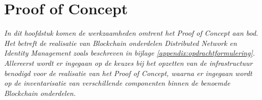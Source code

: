 \chapter{Proof of Concept}

\textit{In dit hoofdstuk komen de werkzaamheden omtrent het Proof of Concept aan bod. Het betreft de realisatie van Blockchain onderdelen Distributed Network en Identity Management zoals beschreven in bijlage \ref{appendix:opdrachtformulering}. Allereerst wordt er ingegaan op de keuzes bij het opzetten van de infrastructuur benodigd voor de realisatie van het Proof of Concept, waarna er ingegaan wordt op de inventarisatie van verschillende componenten binnen de benoemde Blockchain onderdelen.}


\newpage

